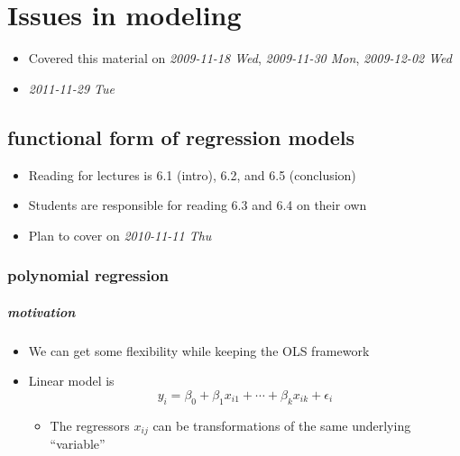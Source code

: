 
\chapter{Issues in modeling}

\begin{itemize}
\item Covered this material on \textit{2009-11-18 Wed}, \textit{2009-11-30 Mon},
     \textit{2009-12-02 Wed}
\item \textit{2011-11-29 Tue}
\end{itemize}
\section{functional form of regression models}
\label{sec-1}

\begin{itemize}
\item Reading for lectures is 6.1 (intro), 6.2, and 6.5 (conclusion)
\item Students are responsible for reading 6.3 and 6.4 on their own
\item Plan to cover on \textit{2010-11-11 Thu}
\end{itemize}
\subsection{polynomial regression}
\label{sec-1-1}
\paragraph{motivation}
\label{sec-1-1-1}

\begin{itemize}
\item We can get some flexibility while keeping the OLS framework
\item Linear model is
        \[y_i = \beta_0 + \beta_1 x_{i1} + \cdots + \beta_k x_{ik} +
        \epsilon_i\]
\begin{itemize}
\item The regressors $x_{ij}$ can be transformations of the same
          underlying ``variable''
\end{itemize}
\end{itemize}
